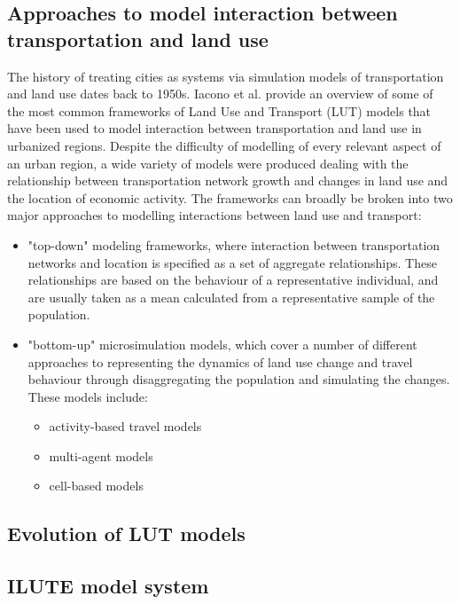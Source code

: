 \subsection{Approaches to model interaction between transportation and land use} \label{subsec:approaches}

The history of treating cities as systems via simulation models of transportation and land use dates back to 1950s\cite{Batty2008}.
Iacono et al.
\cite{Iacono2008} provide an overview of some of the most common frameworks of Land Use and Transport (LUT) models that have been used to model interaction between transportation and land use in urbanized regions.
Despite the difficulty of modelling of every relevant aspect of an urban region, a wide variety of models were produced dealing with the relationship between transportation network growth and changes in land use and the location of economic activity.
The frameworks can broadly be broken into two major approaches to modelling interactions between land use and transport:
\begin{itemize}
    \item "top-down" modeling frameworks, where interaction between transportation networks and location is specified as a set of aggregate relationships.
    These relationships are based on the behaviour of a representative individual, and are usually taken as a mean calculated from a representative sample of the population.
    \item "bottom-up" microsimulation models, which cover a number of different approaches to representing the dynamics of land use change and travel behaviour through disaggregating the population and simulating the changes.
    These models include:
    \begin{itemize}
        \item activity-based travel models
        \item multi-agent models
        \item cell-based models
    \end{itemize}
\end{itemize}

\subsection{Evolution of LUT models} \label{subsec:evolution_of_lut_models}

\subsection{ILUTE model system} \label{subsec:ilute}

